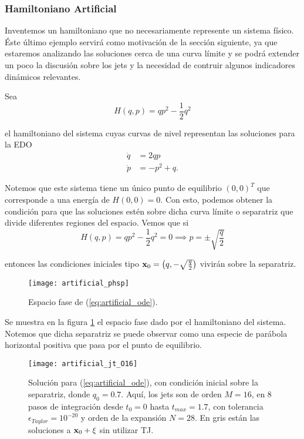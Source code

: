 \subsubsection{Hamiltoniano Artificial}
\label{sec:artificial_ham}

Inventemos un hamiltoniano que no necesariamente represente un sistema físico. Éste último ejemplo servirá como motivación de la sección siguiente, ya que estaremos analizando las soluciones cerca de una curva límite y se podrá extender un poco la discusión sobre los jets y la necesidad de contruir algunos indicadores dinámicos relevantes. 

Sea 
\begin{equation}
 H(q,p) = qp^2 - \frac{1}{2}q^2
 \label{eq:artificial_ham}
\end{equation}

el hamiltoniano del sistema cuyas curvas de nivel representan las soluciones para la EDO
\begin{align}
 \dot{q} &= 2qp \nonumber \\
 \dot{p} &= -p^2 + q.
 \label{eq:artificial_ode}
\end{align}


Notemos que este sistema tiene un único punto de equilibrio $(0,0)^T$ que corresponde a una energía de $H(0,0) = 0$. Con esto, podemos obtener la condición para que las soluciones estén sobre dicha curva límite o separatriz que divide diferentes regiones del espacio. Vemos que si
\begin{equation*}
 H(q,p) = qp^2 - \frac{1}{2}q^2 = 0 \implies p = \pm \sqrt{\frac{q}{2}} 
\end{equation*}

entonces las condiciones iniciales tipo $\mathbf{x}_0 = \left( q, -\sqrt{\frac{q}{2}} \right)$ vivirán sobre la separatriz. 

\begin{figure}[h!]
 \centering
 \texttt{[image: artificial\_phsp]}
 \caption{Espacio fase de (\ref{eq:artificial_ode}).}
 \label{fig:artificial_phsp}
\end{figure}

Se muestra en la figura \ref{fig:artificial_phsp} el espacio fase dado por el hamiltoniano del sistema. Notemos que dicha separatriz se puede observar como una especie de parábola horizontal positiva que pasa por el punto de equilibrio.

\begin{figure}[h!]
 \centering
 \texttt{[image: artificial\_jt\_O16]}
 \caption{Solución para (\ref{eq:artificial_ode}), con condición inicial sobre la separatriz, donde $q_0 = 0.7$. Aquí, los jets son de orden $M=16$, en $8$ pasos de integración desde $t_0 = 0$ hasta $t_{max} = 1.7$, con tolerancia $\epsilon_{Taylor} = 10^{-20}$ y orden de la expansión $N=28$. En gris están las soluciones a $\mathbf{x}_0 + \xi$ sin utilizar TJ.}
 \label{fig:artificial_jt}
\end{figure}

